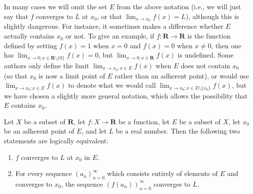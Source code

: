 \begin{remark}\label{9.3.7}
    In many cases we will omit the set \(E\) from the above notation (i.e., we will just say that \(f\) converges to \(L\) at \(x_0\), or that \(\lim_{x \to x_0} f(x) = L\)), although this is slightly dangerous.
    For instance, it sometimes makes a difference whether \(E\) actually contains \(x_0\) or not.
    To give an example, if \(f : \mathbf{R} \to \mathbf{R}\) is the function defined by setting \(f(x) = 1\) when \(x = 0\) and \(f(x) = 0\) when \(x \neq 0\), then one has \(\lim_{x \to 0 ; x \in \mathbf{R} \setminus \{0\}} f(x) = 0\), but \(\lim_{x \to 0 ; x \in \mathbf{R}} f(x)\) is undefined.
    Some authors only define the limit \(\lim_{x \to x_0 ; x \in E} f(x)\) when \(E\) does not contain \(x_0\) (so that \(x_0\) is now a limit point of \(E\) rather than an adherent point), or would use \(\lim_{x \to x_0 ; x \in E} f(x)\) to denote what we would call \(\lim_{x \to x_0 ; x \in E \setminus \{x_0\}} f(x)\), but we have chosen a slightly more general notation, which allows the possibility that \(E\) contains \(x_0\).
\end{remark}

\setcounter{theorem}{8}
\begin{proposition}\label{9.3.9}
    Let \(X\) be a subset of \(\mathbf{R}\), let \(f : X \to \mathbf{R}\) be a function, let \(E\) be a subset of \(X\), let \(x_0\) be an adherent point of \(E\), and let \(L\) be a real number.
    Then the following two statements are logically equivalent:
    \begin{enumerate}
        \item \(f\) converges to \(L\) at \(x_0\) in \(E\).
        \item For every sequence \((a_n)_{n = 0}^\infty\) which consists entirely of elements of \(E\) and converges to \(x_0\), the sequence \((f(a_n))_{n = 0}^\infty\) converges to \(L\).
    \end{enumerate}
\end{proposition}

